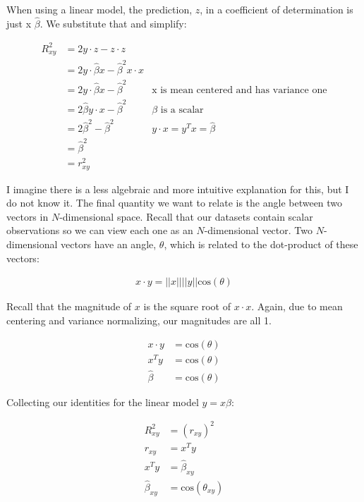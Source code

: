 \documentclass{article}
\begin{document}
When using a linear model, the prediction, $z$, in a coefficient of determination is just
x $\widehat{\beta}$. We substitute that and simplify:

\begin{align*}
R^2_{xy} &= 2 y\cdot z - z\cdot z\\
         &= 2 y\cdot \widehat{\beta} x - \widehat{\beta}^2 x \cdot x \\
         &= 2 y\cdot \widehat{\beta} x - \widehat{\beta}^2 & \text{x is mean centered and has variance one} \\
         &= 2 \widehat{\beta} y\cdot x - \widehat{\beta}^2 & \text{$\beta$ is a scalar} \\
         &= 2 \widehat{\beta}^2 - \widehat{\beta}^2 & \text{$y \cdot x = y^T x = \widehat{\beta}$} \\
         &= \widehat{\beta}^2 \\
         &= r_{xy}^2
\end{align*}

I imagine there is a less algebraic and more intuitive explanation for this, but I do not know
it. The final quantity we want to relate is the angle between two vectors in $N$-dimensional
space. Recall that our datasets contain scalar observations so we can view each one as an
$N$-dimensional vector. Two $N$-dimensional vectors have an angle, $\theta$, which is related to the
dot-product of these vectors:

\begin{align*}
x \cdot y = ||x||||y|| \text{cos}(\theta)
\end{align*}

Recall that the magnitude of $x$ is the square root of $x \cdot x$. Again, due to mean centering and
variance normalizing, our magnitudes are all 1.

\begin{align*}
x \cdot y &= \text{cos}(\theta)\\
x^T y &= \text{cos}(\theta)\\
\widehat{\beta} &= \text{cos}(\theta)
\end{align*}

Collecting our identities for the linear model $y = x \beta$:

\begin{align*}
R^2_{xy} &= (r_{xy})^2 \\
  r_{xy} &= x^T y \\
  x^T y &= \widehat{\beta}_{xy} \\
\widehat{\beta}_{xy} &= \text{cos}(\theta_{xy})
\end{align*}
\end{document}
